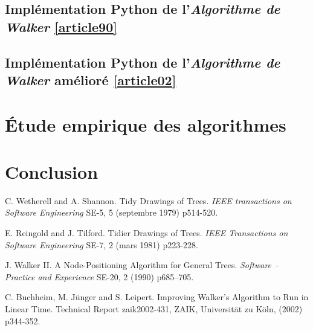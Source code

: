 \documentclass{article}
\begin{document}
\subsection{Implémentation Python de l'\emph{Algorithme de Walker} \ref{article90}}

\subsection{Implémentation Python de l'\emph{Algorithme de Walker} amélioré \ref{article02}}


\newpage
\section{Étude empirique des algorithmes}

\newpage
\section{Conclusion}




\newpage
\medskip

\begin{thebibliography}{10}

C. Wetherell and A. Shannon. Tidy Drawings of Trees. \textit{IEEE transactions on Software Engineering} SE-5, 5 (septembre 1979) p514-520.

E. Reingold and J. Tilford. Tidier Drawings of Trees. \textit{IEEE Transactions on Software Engineering} SE-7, 2 (mars 1981) p223-228.

J. Walker II. A Node-Positioning Algorithm for General Trees. \textit{Software – Practice and Experience} SE-20, 2 (1990) p685–705.

C. Buchheim, M. Jünger and S. Leipert. Improving Walker’s Algorithm to Run in Linear Time. Technical Report zaik2002-431, ZAIK, Universität zu Köln, (2002) p344-352.

\end{thebibliography}
\end{document}
